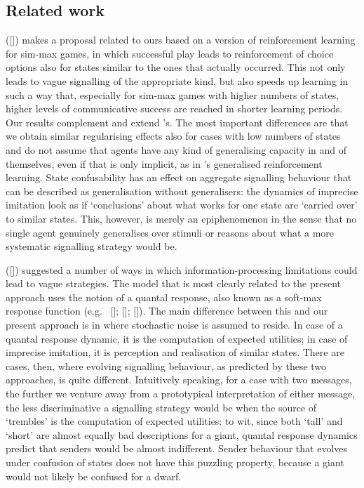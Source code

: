 \documentclass[12pt,english]{article}
\numberwithin{equation}{section}
\newcommand{\citetbjps}[1]{\citeauthor{#1} ([\citeyear{#1}])}
\newcommand{\citealtbjps}[1]{\citeauthor{#1} [\citeyear{#1}]}
\begin{document}
\subsection{Related work}
\citetbjps{OConnor2013:The-Evolution-o} makes a proposal related to ours based on a version of
reinforcement learning for sim-max games, in which successful play leads to reinforcement of
choice options also for states similar to the ones that actually occurred. This not only leads
to vague signalling of the appropriate kind, but also speeds up learning in such a way that,
especially for sim-max games with higher numbers of states, higher levels of communicative
success are reached in shorter learning periods. Our results complement and extend
\citeauthor{OConnor2013:The-Evolution-o}'s. The most important differences are that we obtain
similar regularising effects also for cases with low numbers of states and do not assume that
agents have any kind of generalising capacity in and of themselves, even if that is only
implicit, as in \citeauthor{OConnor2013:The-Evolution-o}'s generalised reinforcement learning.
State confusability has an effect on aggregate signalling behaviour that can be described as
generalisation without generalisers: the dynamics of imprecise imitation look as if
`conclusions' about what works for one state are `carried over' to similar states. This,
however, is merely an epiphenomenon in the sense that no single agent genuinely generalises
over stimuli or reasons about what a more systematic signalling strategy would be.


\citetbjps{FrankeJager2010:Vagueness-Signa} suggested a number of ways in which
in\-for\-ma\-tion-processing limitations could lead to vague strategies. The model that is most
clearly related to the present approach uses the notion of a quantal response, also
known as a soft-max response function
(e.g.~\citealtbjps{Luce1959:Individual-Choi}; \citealtbjps{McFadden1976:Quantal-Choice-}; \citealtbjps{GoereeHolt2008:Quantal-Respons}). The
main difference between this and our present approach is in where stochastic noise is assumed
to reside. In case of a quantal response dynamic, it is the computation of expected utilities;
in case of imprecise imitation, it is perception and realisation of similar states. There are
cases, then, where evolving signalling behaviour, as predicted by these two approaches, is quite
different. Intuitively speaking, for a case with two messages, the further we venture away from
a prototypical interpretation of either message, the less discriminative a signalling strategy
would be when the source of `trembles' is the computation of expected utilities: to wit,
since both `tall' and `short' are almost equally bad descriptions for a giant, quantal
response dynamics predict that senders would be almost indifferent. Sender behaviour that
evolves under confusion of states does not have this puzzling property, because a giant would
not likely be confused for a dwarf. 
\end{document}
